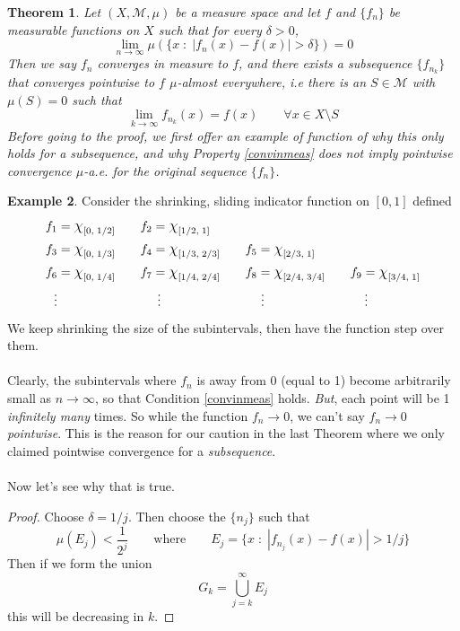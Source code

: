 \documentclass[12pt]{article}
\theoremstyle{plain}
\newtheorem{thm}{Theorem}[subsection]
\theoremstyle{definition}
\newtheorem{ex}[thm]{Example}
\theoremstyle{remark}
\newcommand*{\Chi}{\mbox{\large$\chi$}} %
\begin{document}
\begin{thm}
Let $(X,\mathscr{M},\mu)$ be a measure space and let $f$ and $\{f_n\}$ be measurable functions on $X$ such that for every $\delta>0$, 
\begin{equation}
    \label{convinmeas}
    \lim_{n\rightarrow\infty} \mu\left(
    \{x \; : \; |f_n(x) - f(x)| > \delta\}\right)
    = 0
\end{equation}
Then we say $f_n$ converges \emph{in measure} to $f$, and there exists a subsequence $\{f_{n_k}\}$ that converges pointwise to $f$ $\mu$-almost everywhere, i.e there is an $S\in\mathscr{M}$ with $\mu(S)=0$ such that  
\[
    \lim_{k\rightarrow\infty} f_{n_k}(x) = f(x)
    \qquad \forall x \in X\setminus S
\]
Before going to the proof, we first offer an example of function of why this only holds for a \emph{subsequence}, and why Property \ref{convinmeas} does \emph{not} imply pointwise convergence $\mu$-a.e. for the original sequence $\{f_n\}$.
\end{thm}
\begin{ex}
    Consider the shrinking, sliding indicator function on $[0,1]$ defined
\begin{align*}
    f_1 &= \Chi_{[0,\;1/2]} \qquad
    f_2 = \Chi_{[1/2,\;1]} \\
    f_3 &= \Chi_{[0,\;1/3]} \qquad
    f_4 = \Chi_{[1/3,\;2/3]} \qquad
    f_5 = \Chi_{[2/3,\;1]} \\
    f_6 &= \Chi_{[0,\;1/4]} \qquad
    f_7 = \Chi_{[1/4,\;2/4]} \qquad
    f_8 = \Chi_{[2/4,\;3/4]} \qquad
    f_9 = \Chi_{[3/4,\;1]} \\
    \vdots & 
    \qquad\qquad\qquad\qquad \vdots
    \qquad\qquad\qquad\qquad \vdots
    \qquad\qquad\qquad\qquad \vdots
\end{align*}
We keep shrinking the size of the subintervals, then have the function step over them.
\\
\\
Clearly, the subintervals where $f_n$ is away from 0 (equal to 1) become arbitrarily small as $n\rightarrow\infty$, so that Condition \ref{convinmeas} holds. \emph{But}, each point will be 1 \emph{infinitely many} times. So while the function $f_n\rightarrow 0$, we can't say $f_n\rightarrow 0$ \emph{pointwise}. This is the reason for our caution in the last Theorem where we only claimed pointwise convergence for a \emph{subsequence}.
\\
\\
Now let's see why that is true.
\end{ex}
\begin{proof}
Choose $\delta = 1/j$. Then choose the $\{n_j\}$ such that
\[
    \mu(E_j) < \frac{1}{2^j} \qquad \text{where} \qquad
    E_j = \{ x \; : \; |f_{n_j}(x) -f(x)|>1/j\} 
\]
Then if we form the union
\[
    G_k = \bigcup_{j=k}^\infty E_j 
\]
this will be decreasing in $k$.

\end{proof}
\end{document}
